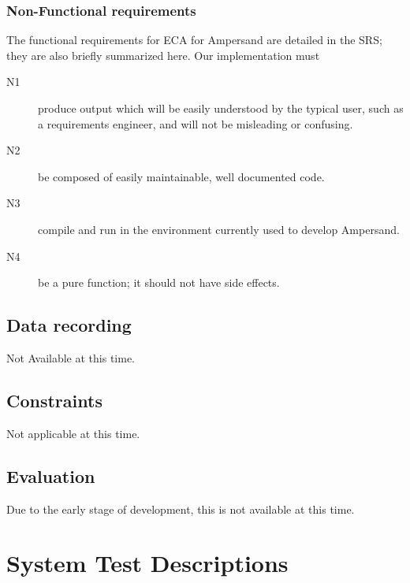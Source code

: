 \documentclass[12pt]{report}
\begin{document}
\subsection{Non-Functional requirements}\label{subsec:NonFunReqs}
The functional requirements for ECA for Ampersand are detailed in the SRS; they
are also briefly summarized here. Our implementation must

\begin{description}
\item[N1] produce output which will be easily understood by the typical user,
  such as a requirements engineer, and will not be misleading or confusing.  
\item[N2] be composed of easily maintainable, well documented code.
\item[N3] compile and run in the environment currently used to develop
  Ampersand.
\item[N4] be a pure function; it should not have side effects.  
\end{description}

\section{Data recording}\label{sec:DataRec}
Not Available at this time.
\section{Constraints}\label{sec:Constraints}
Not applicable at this time.
\section{Evaluation}\label{sec:Evaluation}
Due to the early stage of development, this is not available at this time.

\chapter{System Test Descriptions}\label{ch:SystemTests}
\newcommand{\us}{\textunderscore}
\newcommand{\tabb}{\hspace{35pt}}
\setcounter{sysTestNum}{1}

\newcommand{\ECAIns}[2]{\mathbf{Ins}(#1,#2)}
\newcommand{\ECADel}[2]{\mathbf{Del}(#1,#2)}
\newcommand{\ECAInsDel}[2]{\mathbf{\{Ins/Del\}}(#1,#2)}
\newcommand{\ECADelIns}[2]{\mathbf{\{Del/Ins\}}(#1,#2)}
\newcommand{\ECAOn}{\mathbf{On~}}
\newcommand{\ECADo}{\ECASpacer\mathbf{Do~}}
\newcommand{\ECANop}{\mathbf{Nop~}}
\newcommand{\ECASpacer}{\,\,\,\,}
\newcommand{\IRel}[1]{\mathbb{I}_{#1}}
\newcommand{\VRel}[2]{\mathbb{V}_{#1\times#2}}
\end{document}

